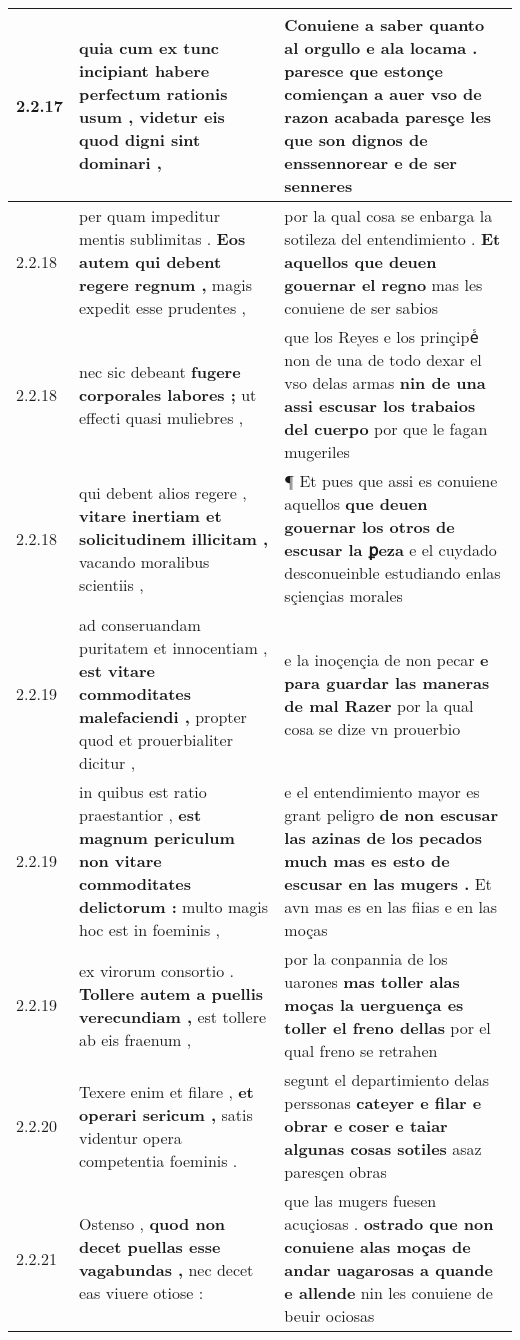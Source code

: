 \begin{tabular}{|p{1cm}|p{6.5cm}|p{6.5cm}|}
2.2.17 & quia cum ex tunc incipiant \textbf{ habere perfectum rationis usum , } videtur eis quod digni sint dominari , & Conuiene a saber quanto al orgullo e ala locama . \textbf{ paresce que estonçe comiençan a auer vso de razon acabada } paresçe les que son dignos de enssennorear e de ser senneres \\\hline
2.2.18 & per quam impeditur mentis sublimitas . \textbf{ Eos autem qui debent regere regnum , } magis expedit esse prudentes , & por la qual cosa se enbarga la sotileza del entendimiento . \textbf{ Et aquellos que deuen gouernar el regno } mas les conuiene de ser sabios \\\hline
2.2.18 & nec sic debeant \textbf{ fugere corporales labores ; } ut effecti quasi muliebres , & que los Reyes e los prinçipeᷤ non de una de todo dexar el vso delas armas \textbf{ nin de una assi escusar los trabaios del cuerpo } por que le fagan mugeriles \\\hline
2.2.18 & qui debent alios regere , \textbf{ vitare inertiam et solicitudinem illicitam , } vacando moralibus scientiis , & ¶ Et pues que assi es conuiene aquellos \textbf{ que deuen gouernar los otros de escusar la ꝑeza } e el cuydado desconueinble estudiando enlas sçiençias morales \\\hline
2.2.19 & ad conseruandam puritatem et innocentiam , \textbf{ est vitare commoditates malefaciendi , } propter quod et prouerbialiter dicitur , & e la inoçençia de non pecar \textbf{ e para guardar las maneras de mal Razer } por la qual cosa se dize vn prouerbio \\\hline
2.2.19 & in quibus est ratio praestantior , \textbf{ est magnum periculum non vitare commoditates delictorum : } multo magis hoc est in foeminis , & e el entendimiento mayor es grant peligro \textbf{ de non escusar las azinas de los pecados much mas es esto de escusar en las mugers . } Et avn mas es en las fiias e en las moças \\\hline
2.2.19 & ex virorum consortio . \textbf{ Tollere autem a puellis verecundiam , } est tollere ab eis fraenum , & por la conpannia de los uarones \textbf{ mas toller alas moças la uerguença es toller el freno dellas } por el qual freno se retrahen \\\hline
2.2.20 & Texere enim et filare , \textbf{ et operari sericum , } satis videntur opera competentia foeminis . & segunt el departimiento delas perssonas \textbf{ cateyer e filar e obrar e coser e taiar algunas cosas sotiles } asaz paresçen obras \\\hline
2.2.21 & Ostenso , \textbf{ quod non decet puellas esse vagabundas , } nec decet eas viuere otiose : & que las mugers fuesen acuçiosas . \textbf{ ostrado que non conuiene alas moças de andar uagarosas a quande e allende } nin les conuiene de beuir ociosas \\\hline

\end{tabular}
